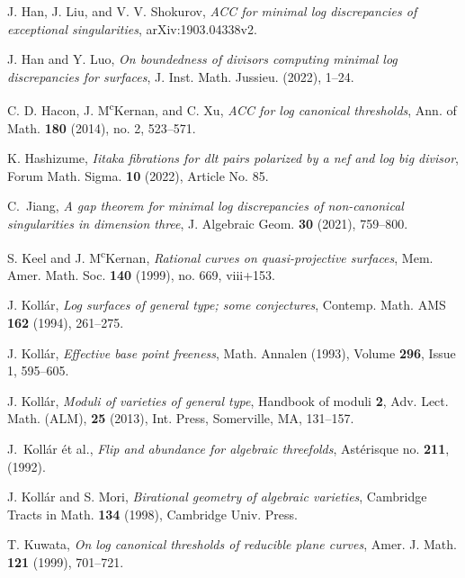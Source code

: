 \documentclass[11pt]{amsart}
\numberwithin{equation}{section}
\theoremstyle{definition}
\theoremstyle{definition}
\theoremstyle{definition}
\begin{document}
\begin{thebibliography}{ABCDE}
 J. Han, J. Liu, and V. V. Shokurov, \textit{ACC for minimal log discrepancies of exceptional singularities}, arXiv:1903.04338v2.

 J. Han and Y. Luo,
\textit{On boundedness of divisors computing minimal log discrepancies for surfaces}, J. Inst. Math. Jussieu. (2022), 1--24.


 C. D. Hacon, J. M\textsuperscript{c}Kernan, and C. Xu, \textit{ACC for log canonical thresholds}, Ann. of Math. \textbf{180} (2014), no. 2, 523--571.

 K. Hashizume, \textit{Iitaka fibrations for dlt pairs polarized by a nef and log big divisor}, Forum Math. Sigma. \textbf{10} (2022), Article No. 85.

 C.~Jiang, \textit{A gap theorem for minimal log discrepancies of non-canonical singularities in dimension three}, J. Algebraic Geom. \textbf{30} (2021), 759--800.

 S. Keel and J. M\textsuperscript{c}Kernan, \textit{Rational curves on quasi-projective surfaces}, Mem. Amer. Math. Soc. \textbf{140} (1999), no. 669, viii+153.

 J. Koll\'ar, \textit{Log surfaces of general type; some conjectures}, Contemp. Math. AMS \textbf{162} (1994), 261--275.



 J. Koll\'{a}r, \textit{Effective base point freeness}, Math. Annalen (1993), Volume \textbf{296}, Issue 1, 595--605.


 J. Koll\'ar, \textit{Moduli of varieties of general type}, Handbook of moduli \textbf{2}, Adv. Lect. Math. (ALM), \textbf{25} (2013), Int. Press, Somerville, MA, 131--157.

 J.~Koll\'{a}r \'{e}t al., \textit{Flip and abundance for algebraic threefolds}, Ast\'{e}risque no. \textbf{211}, (1992).

 J. Koll\'{a}r and S. Mori, \textit{Birational geometry of algebraic varieties}, Cambridge Tracts in Math. \textbf{134} (1998), Cambridge Univ. Press.

 T. Kuwata, \textit{On log canonical thresholds of reducible plane curves}, Amer. J. Math. \textbf{121} (1999), 701--721.


\end{thebibliography}
\end{document}
